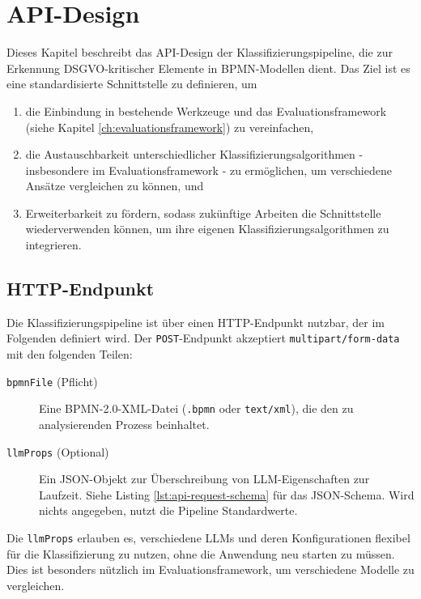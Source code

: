 \section{API-Design}\label{sec:api-design}

Dieses Kapitel beschreibt das API-Design der Klassifizierungspipeline, die zur Erkennung \ac{DSGVO}-kritischer Elemente in \ac{BPMN}-Modellen dient. Das Ziel ist es eine standardisierte Schnittstelle zu definieren, um

\begin{enumerate}
    \item die Einbindung in bestehende Werkzeuge und das Evaluationsframework (siehe Kapitel \ref{ch:evaluationsframework}) zu vereinfachen,
    \item die Austauschbarkeit unterschiedlicher Klassifizierungsalgorithmen - insbesondere im Evaluationsframework - zu ermöglichen, um verschiedene Ansätze vergleichen zu können, und
    \item Erweiterbarkeit zu fördern, sodass zukünftige Arbeiten die Schnittstelle wiederverwenden können, um ihre eigenen Klassifizierungsalgorithmen zu integrieren.
\end{enumerate}

\subsection*{HTTP-Endpunkt}

Die Klassifizierungspipeline ist über einen HTTP-Endpunkt nutzbar, der im Folgenden definiert wird. Der \texttt{POST}-Endpunkt akzeptiert \texttt{multipart/form-data} mit den folgenden Teilen:

\begin{description}
    \item[\texttt{bpmnFile} (Pflicht)] Eine BPMN-2.0-XML-Datei (\texttt{.bpmn} oder \texttt{text/xml}), die den zu analysierenden Prozess beinhaltet.
    \item[\texttt{llmProps} (Optional)] Ein JSON-Objekt zur Überschreibung von \ac{LLM}-Eigenschaften zur Laufzeit. Siehe Listing \ref{lst:api-request-schema} für das JSON-Schema. Wird nichts angegeben, nutzt die Pipeline Standardwerte.
\end{description}

Die \texttt{llmProps} erlauben es, verschiedene \acp{LLM} und deren Konfigurationen flexibel für die Klassifizierung zu nutzen, ohne die Anwendung neu starten zu müssen. Dies ist besonders nützlich im Evaluationsframework, um verschiedene Modelle zu vergleichen.

